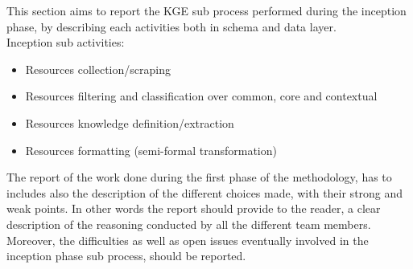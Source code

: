 

This section aims to report the KGE sub process performed during the inception phase, by describing each activities both in schema and data layer.\\

\noindent Inception sub activities:
\begin{itemize}
    \item Resources collection/scraping
    \item Resources filtering and classification over common, core and contextual
    \item Resources knowledge definition/extraction
    \item Resources formatting (semi-formal transformation)
\end{itemize}

\noindent The report of the work done during the first phase of the methodology, has to includes also the description of the  different choices made, with their strong and weak points. In other words the report should provide to the reader, a clear description of the reasoning conducted by all the different team members. Moreover, the difficulties as well as open issues eventually involved in the inception phase sub process, should be reported.\\

